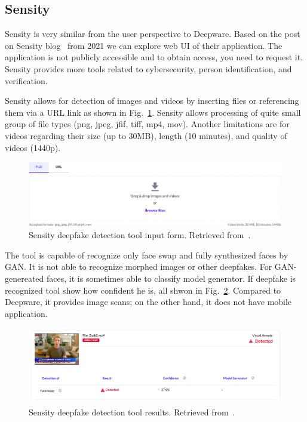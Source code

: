 \subsection{Sensity}

Sensity is very similar from the user perspective to Deepware. Based on the post on Sensity blog~\cite{HowToDetectADeepfakeOnline} from 2021 we can explore web UI of their application. The application is not publicly accessible and to obtain access, you need to request it. Sensity provides more tools related to cybersecurity, person identification, and verification. 

Sensity allows for detection of images and videos by inserting files or referencing them via a URL link as shown in Fig.~\ref{fig:sensity_input}. Sensity allows processing of quite small group of file types (png, jpeg, jfif, tiff, mp4, mov). Another limitations are for videos regarding their size (up to 30MB), length (10 minutes), and quality of videos (1440p).~\cite{HowToDetectADeepfakeOnline}

\begin{figure}[H]
    \centering
    \includegraphics[width=.95\linewidth]{other-fig/sensity_input.png}
    \caption{Sensity deepfake detection tool input form. Retrieved from~\cite{HowToDetectADeepfakeOnline}.}
    \label{fig:sensity_input}
\end{figure}

The tool is capable of recognize only face swap and fully synthesized faces by GAN. It is not able to recognize morphed images or other deepfakes. For GAN-genereated faces, it is sometimes able to classify model generator. If deepfake is recognized tool show how confident he is, all shwon in Fig.~\ref{fig:sensity_results}. Compared to Deepware, it provides image scans; on the other hand, it does not have mobile application.

\begin{figure}[H]
    \centering
    \includegraphics[width=.95\linewidth]{other-fig/sensity_results.png}
    \caption{Sensity deepfake detection tool results. Retrieved from~\cite{HowToDetectADeepfakeOnline}.}
    \label{fig:sensity_results}
\end{figure}

